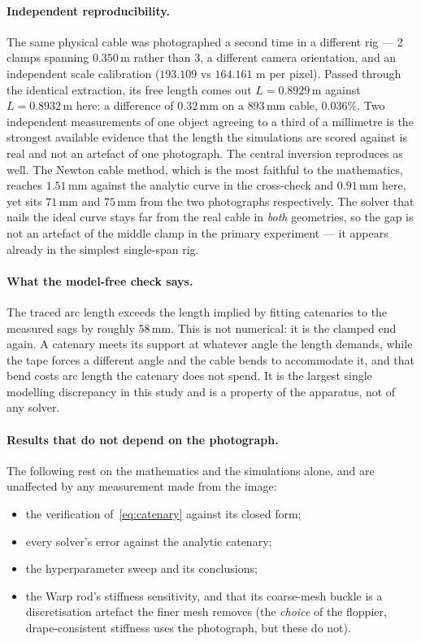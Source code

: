 \documentclass[11pt,a4paper]{article}
\begin{document}
\paragraph{Independent reproducibility.} The same physical cable was photographed a second time in a different rig --- 2 clamps spanning $0.350$\,m rather than 3, a different camera orientation, and an independent scale calibration ($193.109$ vs $164.161$ \textmu m per pixel). Passed through the identical extraction, its free length comes out $L = 0.8929$\,m against $L = 0.8932$\,m here: a difference of $0.32$\,mm on a $893$\,mm cable, $0.036\%$. Two independent measurements of one object agreeing to a third of a millimetre is the strongest available evidence that the length the simulations are scored against is real and not an artefact of one photograph. The central inversion reproduces as well. The Newton cable method, which is the most faithful to the mathematics, reaches $1.51$\,mm against the analytic curve in the cross-check and $0.91$\,mm here, yet sits $71$\,mm and $75$\,mm from the two photographs respectively. The solver that nails the ideal curve stays far from the real cable in \emph{both} geometries, so the gap is not an artefact of the middle clamp in the primary experiment --- it appears already in the simplest single-span rig.

\paragraph{What the model-free check says.} The traced arc length exceeds the
length implied by fitting catenaries to the measured sags by roughly 58\,mm.
This is not numerical: it is the clamped end again. A catenary meets its
support at whatever angle the length demands, while the tape forces a
different angle and the cable bends to accommodate it, and that bend costs arc
length the catenary does not spend. It is the largest single modelling
discrepancy in this study and is a property of the apparatus, not of any
solver.

\paragraph{Results that do not depend on the photograph.} The following rest
on the mathematics and the simulations alone, and are unaffected by any
measurement made from the image:
\begin{itemize}
  \item the verification of~\eqref{eq:catenary} against its closed form;
  \item every solver's error against the analytic catenary;
  \item the hyperparameter sweep and its conclusions;
  \item the Warp rod's stiffness sensitivity, and that its coarse-mesh buckle is
        a discretisation artefact the finer mesh removes (the \emph{choice} of
        the floppier, drape-consistent stiffness uses the photograph, but these
        do not).
\end{itemize}
\end{document}
